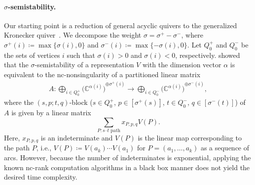 \documentclass[a4paper,11pt]{article}
\numberwithin{equation}{section}
\newcommand{\C}{\mathbb{C}}
\begin{document}
\paragraph{$\sigma$-semistability.}
Our starting point is a reduction of general acyclic quivers to the generalized Kronecker quiver~\cite{Derksen2017,Huszar2021}.
We decompose the weight $\sigma = \sigma^+ - \sigma^-$, where $\sigma^+(i) \coloneqq \max\{\sigma(i), 0\}$ and $\sigma^-(i) \coloneqq \max\{-\sigma(i), 0\}$.
Let $Q_0^+$ and $Q_0^-$ be the sets of vertices $i$ such that $\sigma(i) > 0$ and $\sigma(i) < 0$, respectively.
\citet{Derksen2017} showed that the $\sigma$-semistability of a representation $V$ with the dimension vector $\alpha$ is equivalent to the nc-nonsingularity of a partitioned linear matrix
\begin{align}
    A: \bigoplus_{i \in Q_0^+} {\bigl(\C^{\alpha(i)}\bigr)}^{\oplus \sigma^+(i)} \to \bigoplus_{i \in Q_0^-} {\bigl(\C^{\alpha(i)}\bigr)}^{\oplus \sigma^-(i)},
\end{align}
where the $(s,p;t,q)$-block ($s \in Q_0^+$, $p \in [\sigma^+(s)]$, $t \in Q_0^-$, $q \in [\sigma^-(t)]$) of $A$ is given by a linear matrix
\[
    \sum_{P: \text{$s$--$t$ path}} x_{P,p,q} V(P).
\]
Here, $x_{P,p,q}$ is an indeterminate and $V(P)$ is the linear map corresponding to the path $P$, i.e., $V(P) \coloneqq V(a_k) \cdots V(a_1)$ for $P = (a_1, \dots, a_k)$ as a sequence of arcs.
However, because the number of indeterminates is exponential, applying the known nc-rank computation algorithms in a black box manner does not yield the desired time complexity. 
\end{document}
